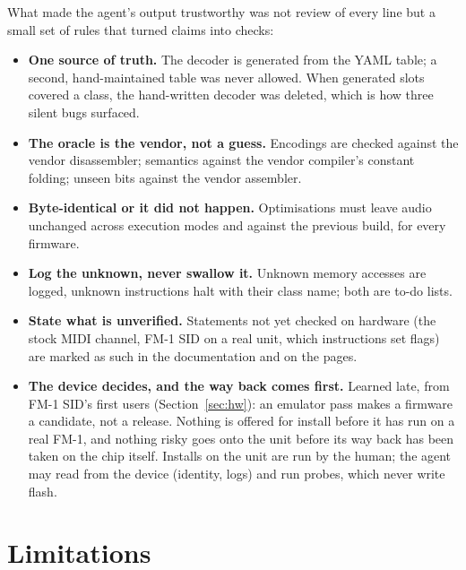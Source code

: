 \documentclass[10pt,a4paper]{article}
\begin{document}
What made the agent's output trustworthy was not review of every line but a small set of rules that
turned claims into checks:

\begin{itemize}
\item \textbf{One source of truth.} The decoder is generated from the YAML table; a second,
  hand-maintained table was never allowed. When generated slots covered a class, the hand-written
  decoder was deleted, which is how three silent bugs surfaced.
\item \textbf{The oracle is the vendor, not a guess.} Encodings are checked against the vendor
  disassembler; semantics against the vendor compiler's constant folding; unseen bits against the
  vendor assembler.
\item \textbf{Byte-identical or it did not happen.} Optimisations must leave audio unchanged across
  execution modes and against the previous build, for every firmware.
\item \textbf{Log the unknown, never swallow it.} Unknown memory accesses are logged, unknown
  instructions halt with their class name; both are to-do lists.
\item \textbf{State what is unverified.} Statements not yet checked on hardware (the stock MIDI
  channel, FM-1 SID on a real unit, which instructions set flags) are marked as such in the
  documentation and on the pages.
\item \textbf{The device decides, and the way back comes first.} Learned late, from FM-1 SID's first
  users (Section~\ref{sec:hw}): an emulator pass makes a firmware a candidate, not a release. Nothing
  is offered for install before it has run on a real FM-1, and nothing risky goes onto the unit
  before its way back has been taken on the chip itself. Installs on the unit are run by the human;
  the agent may read from the device (identity, logs) and run probes, which never write flash.
\end{itemize}

\section{Limitations}
\end{document}
